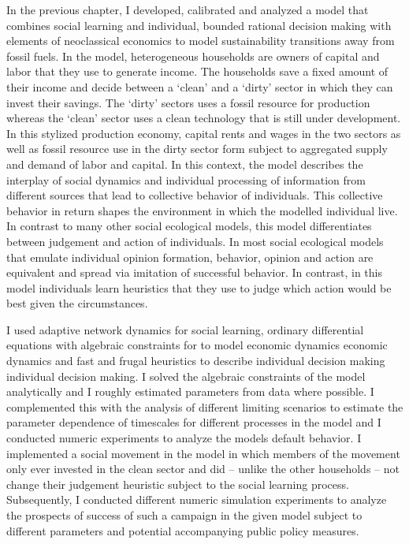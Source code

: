 In the previous chapter, I developed, calibrated and analyzed a model that combines social learning and individual, bounded rational decision making with elements of neoclassical economics to model sustainability transitions away from fossil fuels.
In the model, heterogeneous households are owners of capital and labor that they use to generate income. The households save a fixed amount of their income and decide between a `clean' and a `dirty' sector in which they can invest their savings. The `dirty' sectors uses a fossil resource for production whereas the `clean' sector uses a clean technology that is still under development. In this stylized production economy, capital rents and wages in the two sectors as well as fossil resource use in the dirty sector form subject to aggregated supply and demand of labor and capital.
In this context, the model describes the interplay of social dynamics and individual processing of information from different sources that lead to collective behavior of individuals. This collective behavior in return shapes the environment in which the modelled individual live.
In contrast to many other social ecological models, this model differentiates between judgement and action of individuals. In most social ecological models that emulate individual opinion formation, behavior, opinion and action are equivalent and spread via imitation of successful behavior. In contrast, in this model individuals learn heuristics that they use to judge which action would be best given the circumstances.

I used adaptive network dynamics for social learning, ordinary differential equations with algebraic constraints for to model economic dynamics economic dynamics and fast and frugal heuristics to describe individual decision making individual decision making.
I solved the algebraic constraints of the model analytically and I roughly estimated parameters from data where possible. I complemented this with the analysis of different limiting scenarios to estimate the parameter dependence of timescales for different processes in the model and I conducted numeric experiments to analyze the models default behavior.
I implemented a social movement in the model in which members of the movement only ever invested in the clean sector and did -- unlike the other households -- not change their judgement heuristic subject to the social learning process. Subsequently, I conducted different numeric simulation experiments to analyze the prospects of success of such a campaign in the given model subject to different parameters and potential accompanying public policy measures.


